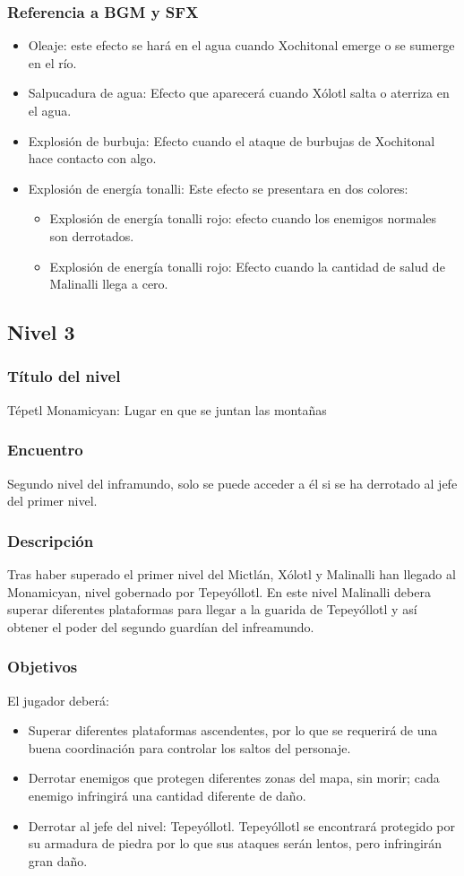 \documentclass[11pt,letterpaper]{article}
\begin{document}
	\subsubsection{Referencia a BGM y SFX}
\begin{itemize}
	\item Oleaje: este efecto se hará en el agua cuando Xochitonal emerge o se sumerge en el río.
	\item Salpucadura de agua: Efecto que aparecerá cuando Xólotl salta o aterriza en el agua.
	\item Explosión de burbuja: Efecto cuando el ataque de burbujas de Xochitonal hace contacto con algo.
	\item Explosión de energía tonalli: Este efecto se presentara en dos colores:
	\begin{itemize}
		\item Explosión de energía tonalli rojo: efecto cuando los enemigos normales son derrotados.
		\item Explosión de energía tonalli rojo: Efecto cuando la cantidad de salud de Malinalli llega a cero.
	\end{itemize}	 
\end{itemize}

	
\subsection{Nivel 3}
	\subsubsection{Título del nivel}
	Tépetl Monamicyan: Lugar en que se juntan las montañas	
	\subsubsection{Encuentro}
Segundo nivel del inframundo, solo se puede acceder a él si se ha derrotado al jefe del primer nivel.
	\subsubsection{Descripción}
	Tras haber superado el primer nivel del Mictlán, Xólotl y Malinalli han llegado al Monamicyan, nivel gobernado por Tepeyóllotl. En este nivel Malinalli debera superar diferentes plataformas para llegar a la guarida de Tepeyóllotl y así obtener el poder del segundo guardían del infreamundo.
	\subsubsection{Objetivos}
	El jugador deberá:
\begin{itemize}
	\item Superar diferentes plataformas ascendentes, por lo que se requerirá de una buena coordinación para controlar los saltos del personaje.
	\item Derrotar enemigos que protegen diferentes zonas del mapa, sin morir; cada enemigo infringirá una cantidad diferente de daño.
	\item Derrotar al jefe del nivel: Tepeyóllotl. Tepeyóllotl se encontrará protegido por su armadura de piedra por lo que sus ataques serán lentos, pero infringirán gran daño.
\end{itemize}
\end{document}
